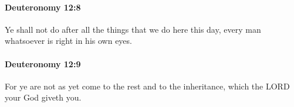 		\paragraph{Deuteronomy 12:8} %
			\label{DEUTERONOMY-12-8}

			Ye shall not do after all the things that we do here this day, every man whatsoever is right in his own eyes.


		\paragraph{Deuteronomy 12:9} %
			\label{DEUTERONOMY-12-9}

			For ye are not as yet come to the rest and to the inheritance, which the LORD your God giveth you.


